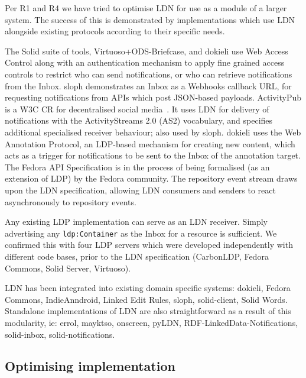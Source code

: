 \documentclass[a4paper]{llncs}
\begin{document}
\par Per \empty R1 and \empty R4 we have tried to optimise LDN for use as a module of a larger system. The success of this is demonstrated by implementations which use LDN alongside existing protocols according to their specific needs.


\par The Solid suite of tools, Virtuoso+ODS-Briefcase, and dokieli use \empty Web Access Control along with an authentication mechanism to apply fine grained access controls to restrict who can send notifications, or who can retrieve notifications from the Inbox. sloph demonstrates an Inbox as a \empty Webhooks callback URL, for requesting notifications from APIs which post JSON-based payloads. \empty ActivityPub is a W3C CR for decentralised social media~\cite{ref-19}. It uses LDN for delivery of notifications with the \empty ActivityStreams 2.0 (AS2) vocabulary, and specifies additional specialised receiver behaviour; also used by sloph. dokieli uses the \empty Web Annotation Protocol, an LDP-based mechanism for creating new content, which acts as a trigger for notifications to be sent to the Inbox of the annotation target. The \empty Fedora API Specification is in the process of being formalised (as an extension of LDP) by the Fedora community. The repository event stream draws upon the LDN specification, allowing LDN consumers and senders to react asynchronously to repository events.


\par Any existing LDP implementation can serve as an LDN receiver. Simply advertising any {\tt ldp:Container} as the Inbox for a resource is sufficient. We confirmed this with four LDP servers which were developed independently with different code bases, prior to the LDN specification (CarbonLDP, Fedora Commons, Solid Server, Virtuoso).


\par LDN has been integrated into existing domain specific systems: dokieli, Fedora Commons, IndieAnndroid, Linked Edit Rules, sloph, solid-client, Solid Words. Standalone implementations of LDN are also straightforward as a result of this modularity, ie: errol, mayktso, onscreen, pyLDN, RDF-LinkedData-Notifications, solid-inbox, solid-notifications.




                                \subsection{Optimising implementation}
  \label{optimising-implementation}
\end{document}
